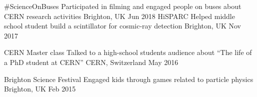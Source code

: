 
\begin{cvhonors}
  \cvhonor 
      {\#ScienceOnBuses}
      {Participated in filming and engaged people on buses about CERN research activities}
      {Brighton, UK}
      {Jun 2018}
  \cvhonor 
      {HiSPARC}
      {Helped middle school student build a scintillator for cosmic-ray detection}
      {Brighton, UK}
      {Nov 2017}

  \cvhonor
      {CERN Master class}
      {Talked to a high-school students audience about ``The life of a PhD student at CERN''}
      {CERN, Switzerland}
      {May 2016}

  \cvhonor
      {Brighton Science Festival}
      {Engaged kids through games related to particle physics}
      {Brighton, UK}
      {Feb 2015}

\end{cvhonors}
